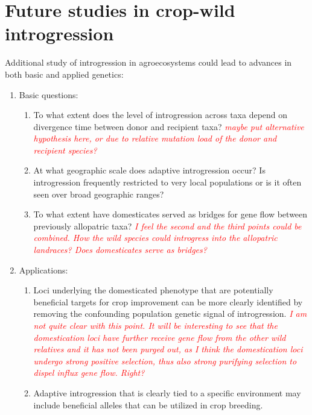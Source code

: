 \documentclass[11pt]{article}
\newcommand{\lwang}[1]{\textcolor{red}{ \emph{\scriptsize  #1}} } %
\begin{document}
\section*{Future studies in crop-wild introgression}
Additional study of introgression in agroecosystems could lead to advances in both basic and applied genetics:
\begin{enumerate}
	\item{Basic questions:}
		\begin{enumerate}
		 	\item{To what extent does the level of introgression across taxa depend on divergence time between donor and recipient taxa?} \lwang{maybe put alternative hypothesis here, or due to relative mutation load of the donor and recipient species?}
		 	\item{At what geographic scale does adaptive introgression occur? Is introgression frequently restricted to very local populations or is it often seen over broad geographic ranges?}
		 	\item{To what extent have domesticates served as bridges for gene flow between previously allopatric taxa?} \lwang{I feel the second and the third points could be combined. How the wild species could introgress into the allopatric landraces? Does domesticates serve as bridges?}
		\end{enumerate} 	
	\item{Applications:}
		\begin{enumerate}
		 	\item{Loci underlying the domesticated phenotype that are potentially beneficial targets for crop improvement can be more clearly identified by removing the confounding population genetic signal of introgression.} \lwang{I am not quite clear with this point. It will be interesting to see that the domestication loci have further receive gene flow from the other wild relatives and it has not been purged out, as I think the domestication loci undergo strong positive selection, thus also strong purifying selection to dispel influx gene flow. Right?}
		 	\item{Adaptive introgression that is clearly tied to a specific environment may include beneficial alleles that can be utilized in crop breeding.}
		 \end{enumerate}
\end{enumerate}



\end{document}
